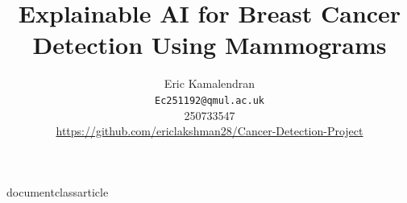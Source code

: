 documentclass{article}

%

\usepackage[final]{nips_2016} %

\usepackage[utf8]{inputenc} %
\usepackage[T1]{fontenc}    %
\usepackage{hyperref}       %
\usepackage{url}            %
\usepackage{booktabs}       %
\usepackage{amsfonts}       %
\usepackage{nicefrac}       %
\usepackage{microtype}      %
\usepackage{algorithm}      %
\usepackage{algorithmic}    %
\usepackage{graphicx}       %

\title{Explainable AI for Breast Cancer Detection Using Mammograms}

\author{
  Eric Kamalendran\\
  \texttt{Ec251192@qmul.ac.uk} \\
  250733547\\
  \url{https://github.com/ericlakshman28/Cancer-Detection-Project}
}



\maketitle

